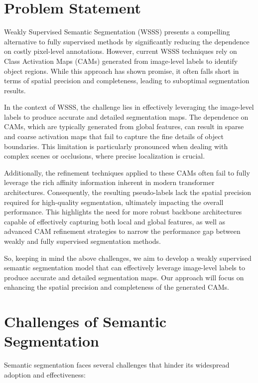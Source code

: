 \section{Problem Statement}
\label{sec:problem_statement}

Weakly Supervised Semantic Segmentation (WSSS) presents a compelling alternative to fully supervised methods by significantly reducing the dependence on costly pixel-level annotations. However, current WSSS techniques rely on Class Activation Maps (CAMs) \cite{cam} generated from image-level labels to identify object regions. While this approach has shown promise, it often falls short in terms of spatial precision and completeness, leading to suboptimal segmentation results.

In the context of WSSS, the challenge lies in effectively leveraging the image-level labels to produce accurate and detailed segmentation maps. The dependence on CAMs, which are typically generated from global features, can result in sparse and coarse activation maps that fail to capture the fine details of object boundaries. This limitation is particularly pronounced when dealing with complex scenes or occlusions, where precise localization is crucial.

Additionally, the refinement techniques applied to these CAMs often fail to fully leverage the rich affinity information inherent in modern transformer architectures. Consequently, the resulting pseudo-labels lack the spatial precision required for high-quality segmentation, ultimately impacting the overall performance. This highlights the need for more robust backbone architectures capable of effectively capturing both local and global features, as well as advanced CAM refinement strategies to narrow the performance gap between weakly and fully supervised segmentation methods.

So, keeping in mind the above challenges, we aim to develop a weakly supervised semantic segmentation model that can effectively leverage image-level labels to produce accurate and detailed segmentation maps. Our approach will focus on enhancing the spatial precision and completeness of the generated CAMs.

\section{Challenges of Semantic Segmentation}
\label{sec:challenges_of_semantic_segmentation}
Semantic segmentation faces several challenges that hinder its widespread adoption and effectiveness:

